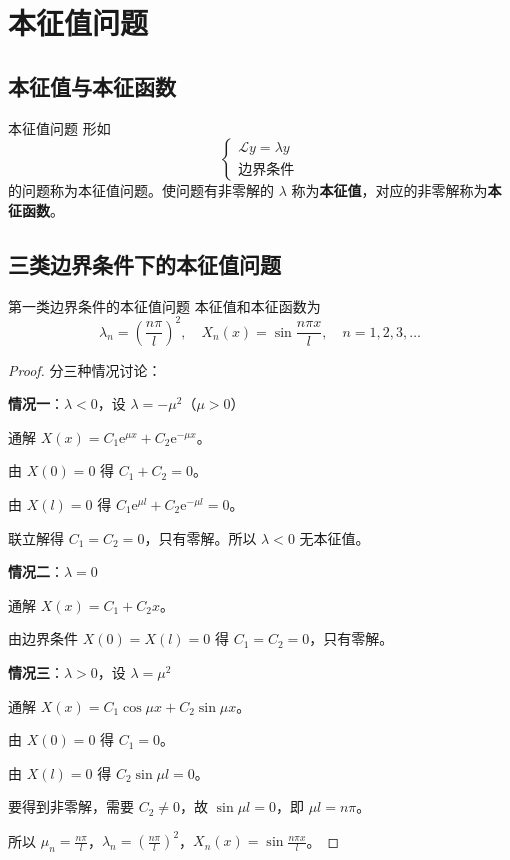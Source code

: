 \section{本征值问题}

\subsection{本征值与本征函数}

\begin{dingliyi}{本征值问题}{}
形如
\begin{equation}
    \begin{cases}
        \mathcal{L}y = \lambda y \\
        \text{边界条件}
    \end{cases}
\end{equation}
的问题称为本征值问题。使问题有非零解的 $\lambda$ 称为\textbf{本征值}，对应的非零解称为\textbf{本征函数}。
\end{dingliyi}

\subsection{三类边界条件下的本征值问题}

\begin{dingli}{第一类边界条件的本征值问题}{}
本征值和本征函数为
\[
    \lambda_n = \left(\frac{n\pi}{l}\right)^2, \quad X_n(x) = \sin\frac{n\pi x}{l}, \quad n = 1, 2, 3, \ldots
\]
\end{dingli}

\begin{proof}
分三种情况讨论：

\textbf{情况一}：$\lambda < 0$，设 $\lambda = -\mu^2$（$\mu > 0$）

通解 $X(x) = C_1\mathrm{e}^{\mu x} + C_2\mathrm{e}^{-\mu x}$。

由 $X(0) = 0$ 得 $C_1 + C_2 = 0$。

由 $X(l) = 0$ 得 $C_1\mathrm{e}^{\mu l} + C_2\mathrm{e}^{-\mu l} = 0$。

联立解得 $C_1 = C_2 = 0$，只有零解。所以 $\lambda < 0$ 无本征值。

\textbf{情况二}：$\lambda = 0$

通解 $X(x) = C_1 + C_2x$。

由边界条件 $X(0) = X(l) = 0$ 得 $C_1 = C_2 = 0$，只有零解。

\textbf{情况三}：$\lambda > 0$，设 $\lambda = \mu^2$

通解 $X(x) = C_1\cos\mu x + C_2\sin\mu x$。

由 $X(0) = 0$ 得 $C_1 = 0$。

由 $X(l) = 0$ 得 $C_2\sin\mu l = 0$。

要得到非零解，需要 $C_2 \neq 0$，故 $\sin\mu l = 0$，即 $\mu l = n\pi$。

所以 $\mu_n = \frac{n\pi}{l}$，$\lambda_n = \left(\frac{n\pi}{l}\right)^2$，$X_n(x) = \sin\frac{n\pi x}{l}$。
\end{proof}

